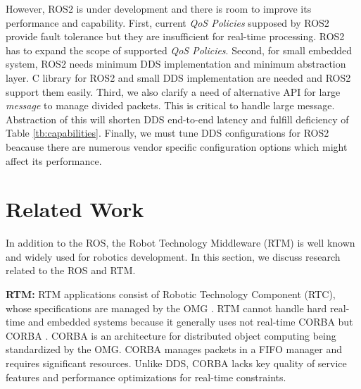 \documentclass{sig-alternate-05-2015}
\begin{document}
However, ROS2 is under development and there is room to improve its performance and capability.
First, current \emph{QoS Policies} supposed by ROS2 provide fault tolerance but they are insufficient for real-time processing.
ROS2 has to expand the scope of supported \emph{QoS Policies}.
Second, for small embedded system, ROS2 needs minimum DDS implementation and minimum abstraction layer.
C library for ROS2 and small DDS implementation are needed and ROS2 support them easily.
Third, we also clarify a need of alternative API for large \emph{message} to manage divided packets.
This is critical to handle large message.
Abstraction of this will shorten DDS end-to-end latency and fulfill deficiency of Table \ref{tb:capabilities}.
Finally, we must tune DDS configurations for ROS2 beacause there are numerous vendor specific configuration options which might affect its performance.


\section{Related Work}
\label{sec:orgheadline3}

In addition to the ROS, the Robot Technology Middleware (RTM) \cite{ando2005rt} is well known and widely used for robotics development. 
In this section, we discuss research related to the ROS and RTM.

\textbf{RTM:} 
RTM applications consist of Robotic Technology Component (RTC), whose specifications are managed by the OMG \cite{omg}. 
RTM cannot handle hard real-time and embedded systems because it generally uses not real-time CORBA \cite{schmidt1998design} but CORBA \cite{vinoski1997corba} \cite{corba3.3}.
CORBA is an architecture for distributed object computing being standardized by the OMG.
CORBA manages packets in a FIFO manager and requires significant resources. 
Unlike DDS, CORBA lacks key quality of service features and performance optimizations for real-time constraints.
\end{document}
